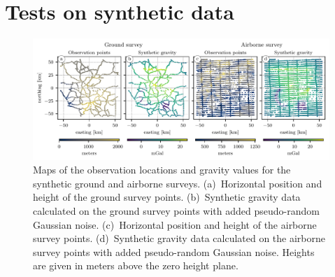 \documentclass[twocolumn]{article}
\begin{document}

\section{Tests on synthetic data}

\begin{figure}
    \includegraphics[width=\linewidth]{figs/synthetic-survey-layouts.pdf}
    \caption{
        Maps of the observation locations and gravity values for the synthetic
        ground and airborne surveys.
        (a)~Horizontal position and height of the ground survey points.
        (b)~Synthetic gravity data calculated on the ground survey points with
        added pseudo-random Gaussian noise.
        (c)~Horizontal position and height of the airborne survey points.
        (d)~Synthetic gravity data calculated on the airborne survey points
        with added pseudo-random Gaussian noise.
        Heights are given in meters above the zero height plane.
    }
    \label{fig:synthetic-layouts}
\end{figure}
\end{document}

